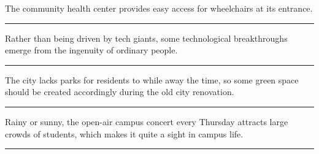 \documentclass[11pt,a4paper]{article}
\newcommand{\num}[1]{\makebox[1.9em][r]{#1.}\hspace{0.3em}}
\newcommand{\wline}{\noindent\rule{\linewidth}{0.4pt}}
\begin{document}
\vspace{0.35em}\vspace{0.15em}

\begin{minipage}{\linewidth}

\num{29}The community health center provides easy access for wheelchairs at its entrance.

\vspace{0.25em}

\wline

\end{minipage}

\begin{minipage}{\linewidth}

\num{30}Rather than being driven by tech giants, some technological breakthroughs emerge from the ingenuity of ordinary people.

\vspace{0.25em}

\wline

\end{minipage}

\begin{minipage}{\linewidth}

\num{31}The city lacks parks for residents to while away the time, so some green space should be created accordingly during the old city renovation.

\vspace{0.25em}

\wline

\end{minipage}

\begin{minipage}{\linewidth}

\num{32}Rainy or sunny, the open-air campus concert every Thursday attracts large crowds of students, which makes it quite a sight in campus life.

\vspace{0.25em}

\wline

\end{minipage}
\end{document}
